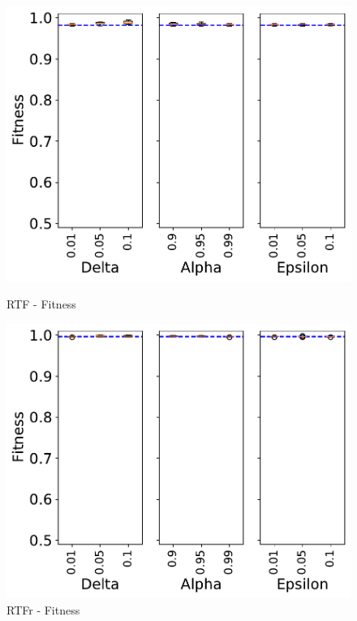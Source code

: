 \documentclass[landscape]{article}
\begin{document}
\begin{figure}[!htb]
\begin{minipage}{0.2\textwidth}
		\includegraphics[width=1.0\textwidth]{../Road_Traffic_Fines_Management_Process/Road_Traffic_Fines_Management_Process_param_fitness.pdf}
		\caption{RTF - Fitness}
	\end{minipage}
	\hfill
	\begin{minipage}{0.2\textwidth}
		\includegraphics[width=1.0\textwidth]{../RTFM_model2/RTFM_model2_param_fitness.pdf}
		\caption{RTFr - Fitness}
	\end{minipage}
\end{figure}
	\newpage
\end{document}
